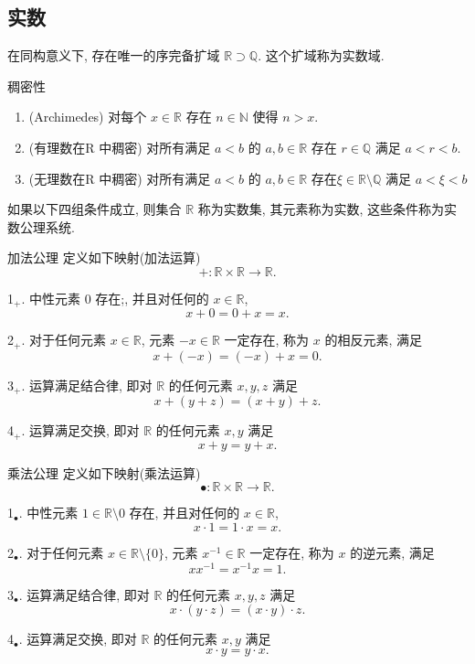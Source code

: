 \documentclass[cn,toc=twocol]{elegantbook}
\newcommand{\ITEMS}{\begin{enumerate}}
\newcommand{\ITEME}{\end{enumerate}}
\newcommand{\R}{\mathbb{R}}
\newcommand{\N}{\mathbb{N}}
\newcommand{\Q}{\mathbb{Q}}
\begin{document}
\subsection{实数}


\begin{theorem}
在同构意义下, 存在唯一的序完备扩域 $\R \supset \Q$. 这个扩域称为实数域.
\end{theorem}



\begin{proposition}{稠密性}
\ITEMS
	\item (Archimedes) 对每个 $x\in\R$ 存在 $n\in\N$ 使得 $n>x$.
	\item (有理数在R 中稠密) 对所有满足 $a<b$ 的 $a,b\in\R$ 存在 $r\in\Q$ 满足 $a<r<b$.
	\item (无理数在R 中稠密) 对所有满足 $a<b$ 的 $a,b\in\R$ 存在$\xi\in\R\setminus\Q$ 满足 $a<\xi<b$
\ITEME
\end{proposition}

如果以下四组条件成立, 则集合 $\R$ 称为实数集, 其元素称为实数, 这些条件称为实数公理系统.

\begin{axiom}{加法公理}
	定义如下映射(加法运算)
	\[
		+:\R\times \R\rightarrow\R.
	\]
	
	1$_+$. 中性元素 $0$ 存在;, 并且对任何的 $x\in \R$, 
	\[
		x+0 = 0+x = x.
	\]
	
	2$_+$. 对于任何元素 $x\in\R$, 元素 $-x\in\R$ 一定存在, 称为 $x$ 的相反元素, 满足
	\[
		x+(-x)=(-x)+x=0.
	\]
	
	3$_+$. 运算满足结合律, 即对 $\R$ 的任何元素 $x, y, z$ 满足
	\[
		x+(y+z) = (x+y)+z.
	\]
	
	4$_+$. 运算满足交换, 即对 $\R$ 的任何元素 $x, y$ 满足
	\[
		x + y = y + x.
	\]
\end{axiom}
	
\begin{axiom}{乘法公理}
	定义如下映射(乘法运算)
	\[
		\bullet:\R\times \R\rightarrow\R.
	\]
	
	1$_\bullet$. 中性元素 $1\in\R\setminus0$ 存在, 并且对任何的 $x\in \R$, 
	\[
		x\cdot 1 = 1\cdot x = x.
	\]
	
	2$_\bullet$. 对于任何元素 $x\in\R\setminus\{0\}$, 元素 $x^{-1}\in\R$ 一定存在, 称为 $x$ 的逆元素, 满足
	\[
		xx^{-1}=x^{-1}x=1.
	\]
	
	3$_\bullet$. 运算满足结合律, 即对 $\R$ 的任何元素 $x, y, z$ 满足
	\[
		x\cdot(y\cdot z) = (x\cdot y)\cdot z.
	\]
	
	4$_\bullet$. 运算满足交换, 即对 $\R$ 的任何元素 $x, y$ 满足
	\[
		x \cdot y = y \cdot x.
	\]
\end{axiom}
	
\end{document}
